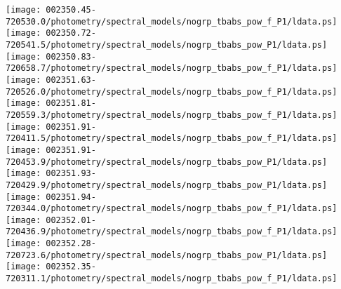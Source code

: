 \documentclass{aastex}
\begin{document}
\begin{figure*}[!ht]
\centering
\texttt{[image: 002350.45-720530.0/photometry/spectral\_models/nogrp\_tbabs\_pow\_f\_P1/ldata.ps]} \hfill 
\texttt{[image: 002350.72-720541.5/photometry/spectral\_models/nogrp\_tbabs\_pow\_P1/ldata.ps]} \hfill 
\texttt{[image: 002350.83-720658.7/photometry/spectral\_models/nogrp\_tbabs\_pow\_f\_P1/ldata.ps]} \\ 
\vspace*{0.5in}
\texttt{[image: 002351.63-720526.0/photometry/spectral\_models/nogrp\_tbabs\_pow\_f\_P1/ldata.ps]} \hfill 
\texttt{[image: 002351.81-720559.3/photometry/spectral\_models/nogrp\_tbabs\_pow\_f\_P1/ldata.ps]} \hfill 
\texttt{[image: 002351.91-720411.5/photometry/spectral\_models/nogrp\_tbabs\_pow\_f\_P1/ldata.ps]} \\ 
\vspace*{0.5in}
\texttt{[image: 002351.91-720453.9/photometry/spectral\_models/nogrp\_tbabs\_pow\_P1/ldata.ps]} \hfill 
\texttt{[image: 002351.93-720429.9/photometry/spectral\_models/nogrp\_tbabs\_pow\_P1/ldata.ps]} \hfill 
\texttt{[image: 002351.94-720344.0/photometry/spectral\_models/nogrp\_tbabs\_pow\_f\_P1/ldata.ps]} \\ 
\vspace*{0.5in}
\texttt{[image: 002352.01-720436.9/photometry/spectral\_models/nogrp\_tbabs\_pow\_f\_P1/ldata.ps]} \hfill 
\texttt{[image: 002352.28-720723.6/photometry/spectral\_models/nogrp\_tbabs\_pow\_P1/ldata.ps]} \hfill 
\texttt{[image: 002352.35-720311.1/photometry/spectral\_models/nogrp\_tbabs\_pow\_f\_P1/ldata.ps]} \\ 
\vspace*{0.5in}
\end{figure*}
\clearpage
\end{document}
